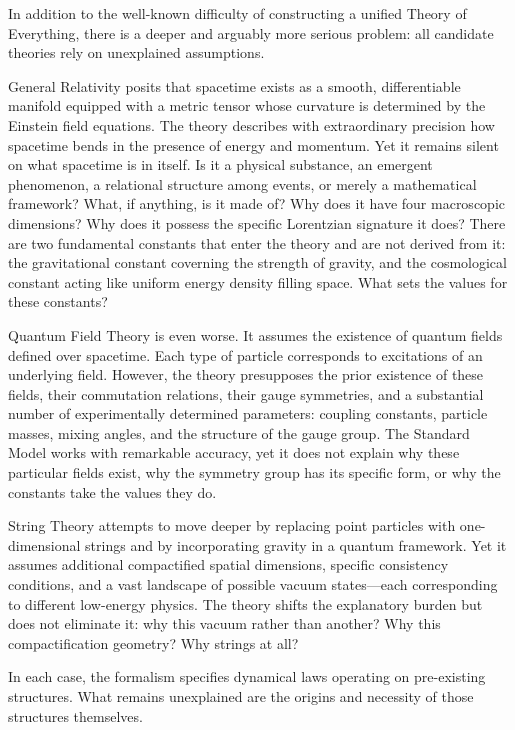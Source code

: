 In addition to the well-known difficulty of constructing a unified Theory of Everything, there is a deeper and arguably more serious problem: all candidate theories rely on unexplained assumptions.

General Relativity posits that spacetime exists as a smooth, differentiable manifold equipped with a metric tensor whose curvature is determined by the Einstein field equations. The theory describes with extraordinary precision how spacetime bends in the presence of energy and momentum. Yet it remains silent on what spacetime is in itself. Is it a physical substance, an emergent phenomenon, a relational structure among events, or merely a mathematical framework? What, if anything, is it made of? Why does it have four macroscopic dimensions? Why does it possess the specific Lorentzian signature it does? There are two fundamental constants that enter the theory and are not derived from it: the gravitational constant coverning the strength of gravity, and the cosmological constant acting like uniform energy density filling space. What sets the values for these constants?

Quantum Field Theory is even worse. It assumes the existence of quantum fields defined over spacetime. Each type of particle corresponds to excitations of an underlying field. However, the theory presupposes the prior existence of these fields, their commutation relations, their gauge symmetries, and a substantial number of experimentally determined parameters: coupling constants, particle masses, mixing angles, and the structure of the gauge group. The Standard Model works with remarkable accuracy, yet it does not explain why these particular fields exist, why the symmetry group has its specific form, or why the constants take the values they do.

String Theory attempts to move deeper by replacing point particles with one-dimensional strings and by incorporating gravity in a quantum framework. Yet it assumes additional compactified spatial dimensions, specific consistency conditions, and a vast landscape of possible vacuum states—each corresponding to different low-energy physics. The theory shifts the explanatory burden but does not eliminate it: why this vacuum rather than another? Why this compactification geometry? Why strings at all?

In each case, the formalism specifies dynamical laws operating on pre-existing structures. What remains unexplained are the origins and necessity of those structures themselves.

